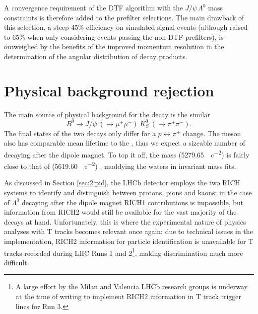 A convergence requirement of the DTF algorithm with the $J/\psi\,\Lambda^0$ mass constraints is therefore added to the prefilter selections.
The main drawback of this selection, a steep 45\% efficiency on simulated signal events (although raised to 65\% when only considering events passing the non-DTF prefilters), is outweighed by the benefits of the improved momentum resolution in the determination of the angular distribution of \lambdadecay decay products.

\section{Physical background rejection}
\label{sec:4:phys_bkg}

The main source of physical background for the \demonstratorfull decay is the similar
\begin{equation}
	B^0 \rightarrow J/\psi~(\rightarrow \mu^+ \mu^-)~K_S^0~(\rightarrow \pi^+ \pi^-).
\end{equation}
The final states of the two decays only differ for a $p \leftrightarrow \pi^+$ change.
The \kshort meson also has comparable mean lifetime to the \lz, thus we expect a sizeable number of \kshort decaying after the dipole magnet.
To top it off, the \bz mass (\SI{5279.65}{\mev\per c\squared}) is fairly close to that of \lbz (\SI{5619.60}{\mev\per c\squared}) \cite{PDG}, muddying the waters in invariant mass fits.

As discussed in Section \ref{sec:2:pid}, the LHCb detector employs the two RICH systems to identify and distinguish between protons, pions and kaons;
in the case of $\Lambda^0$ decaying after the dipole magnet RICH1 contributions is impossible, but information from RICH2 would still be available for the vast majority of the decays at hand.
Unfortunately, this is where the experimental nature of physics analyses with T tracks becomes relevant once again:
due to technical issues in the implementation, RICH2 information for particle identification is unavailable for T tracks recorded during LHC Runs 1 and 2\footnote{A large effort by the Milan and Valencia LHCb research groups is underway at the time of writing to implement RICH2 information in T track trigger lines for Run 3.}, making \physbkgshort discrimination much more difficult.

